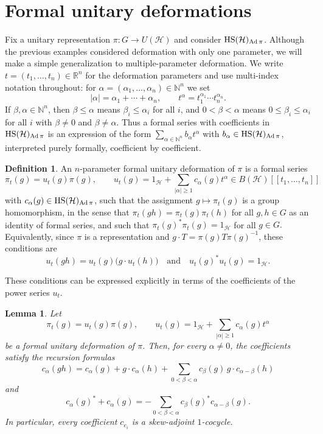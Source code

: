 \documentclass[12pt]{amsproc}
\theoremstyle{plain}
\newtheorem{lemma}[theorem]{Lemma}
\theoremstyle{definition}
\newtheorem{definition}[theorem]{Definition}
\numberwithin{equation}{section}
\newcommand{\HS}{{\rm HS}}
\newcommand{\N}{\mathbb{N}}
\DeclareMathOperator{\Ad}{Ad}
\begin{document}
\section{Formal unitary deformations}\label{sec:formal}

Fix a unitary representation $\pi\colon G\to U(\mathcal H)$ and consider $\HS(\mathcal H)_{\Ad\pi}$.
Although the previous examples considered deformation with only one parameter, we will make a simple generalization to multiple-parameter deformation. We write $t=(t_1,\dots,t_n) \in \mathbb R^n$ for the deformation parameters and use multi-index notation throughout: for $\alpha=(\alpha_1,\dots,\alpha_n)\in \N^n$ we set
\[
|\alpha|=\alpha_1+\cdots+\alpha_n,
\qquad
t^\alpha=t_1^{\alpha_1}\cdots t_n^{\alpha_n}.
\]
If $\beta,\alpha\in \N^n$, then $\beta\le \alpha$ means $\beta_i\le \alpha_i$ for all $i$, and $0<\beta<\alpha$ means $0\le \beta_i\le \alpha_i$ for all $i$ with $\beta\neq 0$ and $\beta\neq \alpha$. Thus a formal series with coefficients in $\HS(\mathcal H)_{\Ad\pi}$ is an expression of the form $\sum_{\alpha\in \N^n} b_\alpha t^\alpha$ with $b_\alpha\in \HS(\mathcal H)_{\Ad\pi}$, interpreted purely formally, coefficient by coefficient.

\begin{definition}\label{def:formal-unitary-deformation}
An $n$-parameter formal unitary deformation of $\pi$ is a formal series
\[
\pi_t(g)=u_t(g)\pi(g),
\qquad
u_t(g)=1_{\mathcal H}+\sum_{|\alpha|\ge 1}c_\alpha(g)t^\alpha \in B(\mathcal H)[[t_1,\dots,t_n]]
\]
with $c_\alpha(g)\in \HS(\mathcal H)_{\Ad\pi}$, such that the assignment $g\mapsto \pi_t(g)$ is a group homomorphism, in the sense that
$
\pi_t(gh)=\pi_t(g)\pi_t(h)$ for all $g,h\in G$
as an identity of formal series, and such that
$
\pi_t(g)^*\pi_t(g)=1_{\mathcal H}$ for all $
g\in G.
$
Equivalently, since $\pi$ is a representation and $g\cdot T=\pi(g)T\pi(g)^{-1}$, these conditions are
\begin{equation}\label{eq:formal-unitary}
u_t(gh)=u_t(g)\bigl(g\cdot u_t(h)\bigr)
\quad\text{and}\quad
u_t(g)^*u_t(g)=1_{\mathcal H}.
\end{equation}
\end{definition}


These conditions can be expressed explicitly in terms of the coefficients of the power series $u_t$.


\begin{lemma}\label{lem:firstorder}
Let
\[
\pi_t(g)=u_t(g)\pi(g),
\qquad
u_t(g)=1_{\mathcal H}+\sum_{|\alpha|\ge 1}c_\alpha(g)t^\alpha
\]
be a formal unitary deformation of $\pi$. Then, for every $\alpha\ne 0$, the coefficients satisfy the recursion formulas
\begin{equation}\label{eq:formalrecursion}
c_\alpha(gh)=c_\alpha(g)+g\cdot c_\alpha(h)+\sum_{0<\beta<\alpha}c_\beta(g)\,g\cdot c_{\alpha-\beta}(h)
\end{equation}
and
\begin{equation}\label{eq:unitarycoeff}
c_\alpha(g)^*+c_\alpha(g)=-\sum_{0<\beta<\alpha}c_\beta(g)^*c_{\alpha-\beta}(g).
\end{equation}
In particular, every coefficient $c_{e_i}$ is a skew-adjoint $1$-cocycle.
\end{lemma}
\end{document}
